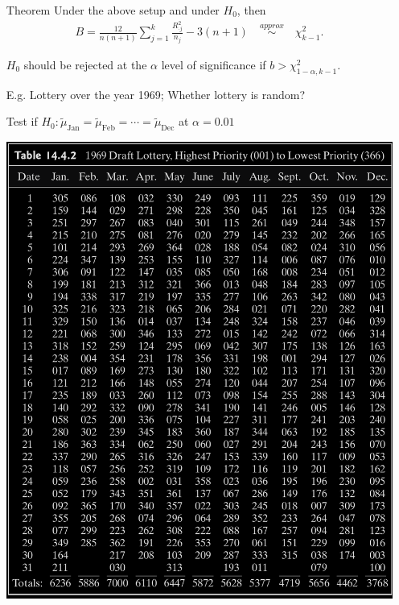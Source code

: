 \begin{frame}[fragile]
\begin{itemize}
	\item[Theorem] Under the above setup and under $H_0$, then
	\begin{align*}
		B= \frac{12}{n(n+1)}\sum_{j=1}^k \frac{R_{\cdot j}^2}{n_j} -3(n+1) \quad \stackrel{approx}{\sim}\quad \chi^2_{k-1}.
	\end{align*}
	\bigskip
	\item[] $H_0$ should be rejected at the $\alpha$ level of significance if  $b>\chi^2_{1-\alpha,k-1}$.
\end{itemize}
\end{frame}
\begin{frame}[fragile]
\begin{itemize}
	\item[E.g.] Lottery over the year 1969; Whether lottery is random?
	\begin{center}
	Test if $H_0:\widetilde{\mu}_{\text{Jan}} = \widetilde{\mu}_{\text{Feb}} = \cdots = \widetilde{\mu}_{\text{Dec}}$	at $\alpha=0.01$
	\bigskip

	\includegraphics[scale=0.16]{Codes/Table14-4-2.png}
	\end{center}
\end{itemize}
\end{frame}
